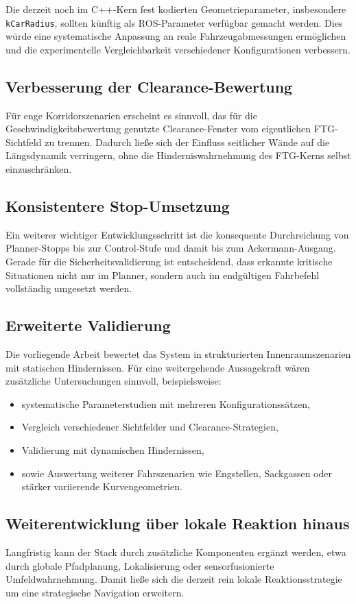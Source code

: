 Die derzeit noch im C++-Kern fest kodierten Geometrieparameter, insbesondere \texttt{kCarRadius}, sollten künftig als ROS-Parameter verfügbar gemacht werden. Dies würde eine systematische Anpassung an reale Fahrzeugabmessungen ermöglichen und die experimentelle Vergleichbarkeit verschiedener Konfigurationen verbessern.

\subsection*{Verbesserung der Clearance-Bewertung}

Für enge Korridorszenarien erscheint es sinnvoll, das für die Geschwindigkeitsbewertung genutzte Clearance-Fenster vom eigentlichen FTG-Sichtfeld zu trennen. Dadurch ließe sich der Einfluss seitlicher Wände auf die Längsdynamik verringern, ohne die Hinderniswahrnehmung des FTG-Kerns selbst einzuschränken.

\subsection*{Konsistentere Stop-Umsetzung}

Ein weiterer wichtiger Entwicklungsschritt ist die konsequente Durchreichung von Planner-Stopps bis zur Control-Stufe und damit bis zum Ackermann-Ausgang. Gerade für die Sicherheitsvalidierung ist entscheidend, dass erkannte kritische Situationen nicht nur im Planner, sondern auch im endgültigen Fahrbefehl vollständig umgesetzt werden.

\subsection*{Erweiterte Validierung}

Die vorliegende Arbeit bewertet das System in strukturierten Innenraumszenarien mit statischen Hindernissen. Für eine weitergehende Aussagekraft wären zusätzliche Untersuchungen sinnvoll, beispielsweise:

\begin{itemize}
    \item systematische Parameterstudien mit mehreren Konfigurationssätzen,
    \item Vergleich verschiedener Sichtfelder und Clearance-Strategien,
    \item Validierung mit dynamischen Hindernissen,
    \item sowie Auswertung weiterer Fahrszenarien wie Engstellen, Sackgassen oder stärker variierende Kurvengeometrien.
\end{itemize}

\subsection*{Weiterentwicklung über lokale Reaktion hinaus}

Langfristig kann der Stack durch zusätzliche Komponenten ergänzt werden, etwa durch globale Pfadplanung, Lokalisierung oder sensorfusionierte Umfeldwahrnehmung. Damit ließe sich die derzeit rein lokale Reaktionsstrategie um eine strategische Navigation erweitern.
